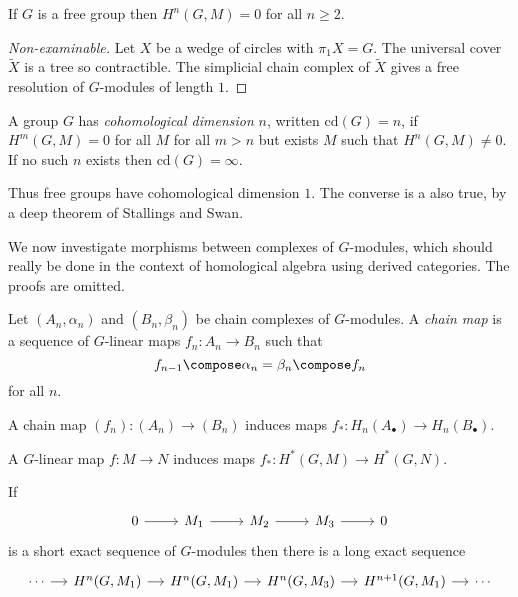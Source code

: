 \documentclass[a4paper]{article}
\begin{document}
\begin{proposition}\label{prop:cohomological dimension of free group}
  If \(G\) is a free group then \(H^n(G, M) = 0\) for all \(n \geq 2\).
\end{proposition}

\begin{proof}[Non-examinable]
  Let \(X\) be a wedge of circles with \(\pi_1 X = G\). The universal cover \(\widetilde X\) is a tree so contractible. The simplicial chain complex of \(\widetilde X\) gives a free resolution of \(G\)-modules of length \(1\).
\end{proof}

\begin{definition}
  A group \(G\) has \emph{cohomological dimension} \(n\), written \(\mathrm{cd}(G) = n\), if \(H^m(G, M) = 0\) for all \(M\) for all \(m > n\) but exists \(M\) such that \(H^n(G, M) \ne 0\). If no such \(n\) exists then \(\mathrm{cd}(G) = \infty\).
\end{definition}

Thus free groups have cohomological dimension \(1\). The converse is a also true, by a deep theorem of Stallings and Swan.

We now investigate morphisms between complexes of \(G\)-modules, which should really be done in the context of homological algebra using derived categories. The proofs are omitted.

\begin{definition}
  Let \((A_n, \alpha_n)\) and \((B_n, \beta_n)\) be chain complexes of \(G\)-modules. A \emph{chain map} is a sequence of \(G\)-linear maps \(f_n: A_n \to B_n\) such that
  \[
    f_{n - 1} \compose \alpha_n = \beta_n \compose f_n
  \]
  for all \(n\).
\end{definition}

\begin{proposition}
  A chain map \((f_n): (A_n) \to (B_n)\) induces maps \(f_*: H_n(A_\bullet) \to H_n(B_\bullet)\).
\end{proposition}

\begin{corollary}
  A \(G\)-linear map \(f: M \to N\) induces maps \(f_*: H^*(G, M) \to H^*(G, N)\).
\end{corollary}

\begin{proposition}
  If
  \[
    \begin{tikzcd}
      0 \ar[r] & M_1 \ar[r] & M_2 \ar[r] & M_3 \ar[r] & 0
    \end{tikzcd}
  \]
  is a short exact sequence of \(G\)-modules then there is a long exact sequence
  \[
    \begin{tikzcd}[column sep=small]
      \cdots \ar[r] & H^n(G, M_1) \ar[r] & H^n(G, M_1) \ar[r] & H^n(G, M_3) \ar[r] & H^{n + 1}(G, M_1) \ar[r] & \cdots
    \end{tikzcd}
  \]
\end{proposition}
\end{document}
